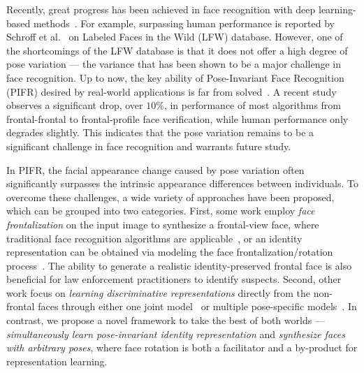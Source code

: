 \documentclass[10pt,journal,compsoc]{IEEEtran}
\begin{document}
\maketitle


\IEEEdisplaynontitleabstractindextext



\IEEEpeerreviewmaketitle


Recently, great progress has been achieved in face recognition with deep learning-based methods~\cite{taigman2014deepface, parkhi2015deep, schroff2015facenet}.
For example, surpassing human performance is reported by Schroff et al.~\cite{schroff2015facenet} on Labeled
Faces in the Wild (LFW) database. 
However, one of the shortcomings of the LFW database is that it does not offer a high degree of pose variation --- the variance that has been shown to be a major challenge in face recognition. 
Up to now, the key ability of Pose-Invariant Face Recognition (PIFR) desired by real-world applications is far from solved~\cite{liu2005pose, liu2006optimal, chai2007locally, abiantun2014sparse, ding2016comprehensive}.
A recent study~\cite{sengupta2016frontal} observes a significant drop, over $10\%$, in performance of most algorithms from frontal-frontal to frontal-profile face verification, while human performance only degrades slightly.
This indicates that the pose variation remains to be a significant challenge in face recognition and warrants future study.

In PIFR, the facial appearance change caused by pose variation often significantly surpasses the intrinsic appearance differences between individuals. 
To overcome these challenges, a wide variety of approaches have been proposed, which can be grouped into two categories.
First, some work employ {\it face frontalization} on the input image to synthesize a frontal-view face, where traditional face recognition algorithms are applicable~\cite{hassner2015effective, zhu2015high}, or an identity representation can be obtained via modeling the face frontalization/rotation process~\cite{kan2014stacked,zhu2014multi,yim2015rotating}.
The ability to generate a realistic identity-preserved frontal face is also beneficial for law enforcement practitioners to identify suspects.
Second, other work focus on {\it learning discriminative representations} directly from the non-frontal faces through either one joint model~\cite{parkhi2015deep,schroff2015facenet} or multiple pose-specific models~\cite{masi2016pose,ding2015robust}.
In contrast, we propose a novel framework to take the best of both worlds --- {\it simultaneously learn pose-invariant identity representation} and {\it synthesize faces with arbitrary poses}, where face rotation is both a facilitator and a by-product for representation learning.
\end{document}
